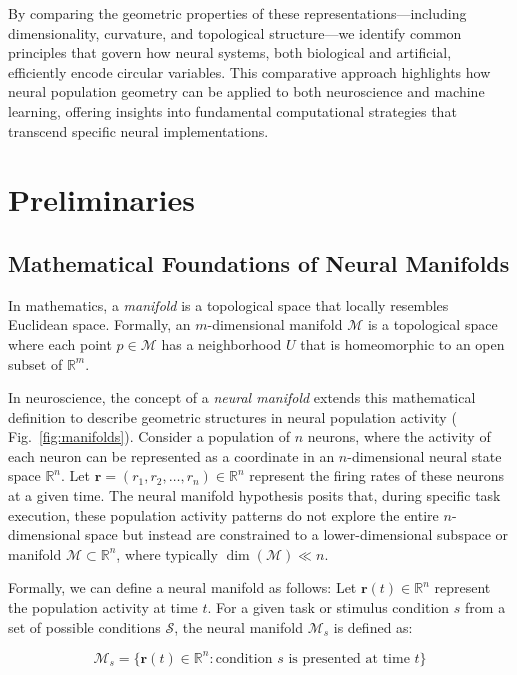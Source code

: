 \documentclass[11pt,a4paper]{article}
\begin{document}
By comparing the geometric properties of these representations---including dimensionality, curvature, and topological structure---we identify common principles that govern how neural systems, both biological and artificial, efficiently encode circular variables. This comparative approach highlights how neural population geometry can be applied to both neuroscience and machine learning, offering insights into fundamental computational strategies that transcend specific neural implementations.

\section{Preliminaries}

\subsection{Mathematical Foundations of Neural Manifolds}

In mathematics, a \textit{manifold} is a topological space that locally resembles Euclidean space. Formally, an $m$-dimensional manifold $\mathcal{M}$ is a topological space where each point $p \in \mathcal{M}$ has a neighborhood $U$ that is homeomorphic to an open subset of $\mathbb{R}^m$. 

In neuroscience, the concept of a \textit{neural manifold} extends this mathematical definition to describe geometric structures in neural population activity ( Fig.~\ref{fig:manifolds}). Consider a population of $n$ neurons, where the activity of each neuron can be represented as a coordinate in an $n$-dimensional neural state space $\mathbb{R}^n$. Let $\mathbf{r} = (r_1, r_2, \ldots, r_n) \in \mathbb{R}^n$ represent the firing rates of these neurons at a given time. The neural manifold hypothesis posits that, during specific task execution, these population activity patterns do not explore the entire $n$-dimensional space but instead are constrained to a lower-dimensional subspace or manifold $\mathcal{M} \subset \mathbb{R}^n$, where typically $\dim(\mathcal{M}) \ll n$.

Formally, we can define a neural manifold as follows: Let $\mathbf{r}(t) \in \mathbb{R}^n$ represent the population activity at time $t$. For a given task or stimulus condition $s$ from a set of possible conditions $\mathcal{S}$, the neural manifold $\mathcal{M}_s$ is defined as:

\begin{equation}
\mathcal{M}_s = \{\mathbf{r}(t) \in \mathbb{R}^n : \text{condition } s \text{ is presented at time } t\}
\end{equation}
\end{document}
